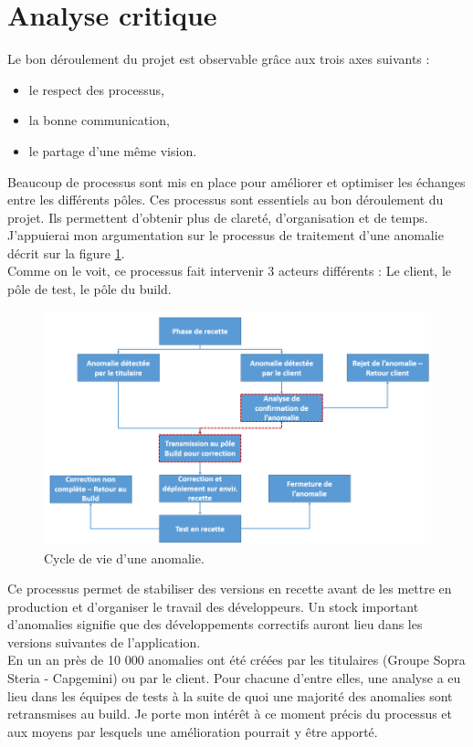 \documentclass[12pt,a4paper]{article}
\begin{document}
\section{Analyse critique}
Le bon déroulement du projet est observable grâce aux trois axes suivants :
\begin{itemize}
\item le respect des processus,
\item la bonne communication,
\item le partage d'une même vision.
\end{itemize}
Beaucoup de processus sont mis en place pour améliorer et optimiser les échanges entre les différents pôles. Ces processus sont essentiels au bon déroulement du projet. Ils permettent d'obtenir plus de clareté, d'organisation et de temps. J'appuierai mon argumentation sur le processus de traitement d'une anomalie décrit sur la figure \ref{cycleVieAnomalie}.\\
Comme on le voit, ce processus fait intervenir 3 acteurs différents : Le client, le pôle de test, le pôle du build. 
\begin{figure}[!hp]
		\begin{center}
			\includegraphics[width=1.1\textwidth,keepaspectratio]{cycleAnomalie2.png}
			\caption{Cycle de vie d'une anomalie.}
			\label{cycleVieAnomalie}
		\end{center}
\end{figure}
\clearpage
\newpage
Ce processus permet de stabiliser des versions en recette avant de les mettre en production et d'organiser le travail des développeurs. Un stock important d'anomalies signifie que des développements correctifs auront lieu dans les versions suivantes de l'application.\\
En un an près de 10 000 anomalies ont été créées par les titulaires (Groupe Sopra Steria - Capgemini) ou par le client. Pour chacune d'entre elles, une analyse a eu lieu dans les équipes de tests à la suite de quoi une majorité des anomalies sont retransmises au build. Je porte mon intérêt à ce moment précis du processus et aux moyens par lesquels une amélioration pourrait y être apporté.\\
\end{document}
